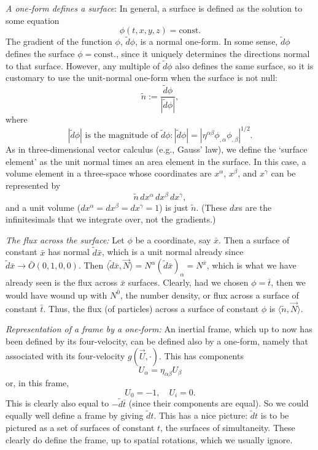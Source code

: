 \documentclass[12pt]{book}
\begin{document}
    \textit{A one-form defines a surface}: 
    In general, a surface is defined as the solution to some equation
    \[
    \phi(t, x, y, z) = \text{const.}
    \]
    The gradient of the function \(\phi\), \(\tilde{d}\phi\), is a normal one-form. In some sense, \(\tilde{d}\phi\) defines the surface \(\phi = \text{const.}\), since it uniquely determines the directions normal to that surface. However, any multiple of \(\tilde{d}\phi\) also defines the same surface, so it is customary to use the unit-normal one-form when the surface is not null:
    \[
    \tilde{n} := \frac{\tilde{d}\phi}{|\tilde{d}\phi|}, \tag{4.7}
    \]
    where
    \[
    |\tilde{d}\phi| \text{ is the magnitude of } \tilde{d}\phi : |\tilde{d}\phi| = \left|\eta^{\alpha\beta} \phi_{,\alpha} \phi_{,\beta}\right|^{1/2}. \tag{4.8}
    \]
    As in three-dimensional vector calculus (e.g., Gauss’ law), we define the ‘surface element’ as the unit normal times an area element in the surface. In this case, a volume element in a three-space whose coordinates are \(x^\alpha\), \(x^\beta\), and \(x^\gamma\) can be represented by
    \[
    \tilde{n} \, dx^\alpha \, dx^\beta \, dx^\gamma, \tag{4.9}
    \]
    and a unit volume (\(dx^\alpha = dx^\beta = dx^\gamma = 1\)) is just \(\tilde{n}\). (These \(dx\)s are the infinitesimals that we integrate over, not the gradients.)

    \textit{The flux across the surface:} 
    Let \(\phi\) be a coordinate, say \(\bar{x}\). Then a surface of constant \(\bar{x}\) has normal \(\tilde{d} \bar{x}\), which is a unit normal already since \(\tilde{d} \bar{x} \rightarrow \bar{O} (0, 1, 0, 0)\). Then \(\langle \tilde{d} \bar{x}, \vec{N} \rangle = N^\alpha (\tilde{d} \bar{x})_\alpha = N^{\bar{x}}\), which is what we have already seen is the flux across \(\bar{x}\) surfaces. Clearly, had we chosen \(\phi = \bar{t}\), then we would have wound up with \(N^{\bar{0}}\), the number density, or flux across a surface of constant \(\bar{t}\). Thus, the flux (of particles) across a surface of constant \(\phi\) is \(\langle \tilde{n}, \vec{N} \rangle\).

    \textit{Representation of a frame by a one-form:} 
    An inertial frame, which up to now has been defined by its four-velocity, can be defined also by a one-form, namely that associated with its four-velocity \(g(\vec{U}, \cdot)\). This has components
    \[
    U_\alpha = \eta_{\alpha\beta} U_\beta
    \]
    or, in this frame,
    \[
    U_0 = -1, \quad U_i = 0.
    \]
    This is clearly also equal to \(-\tilde{d}\bar{t}\) (since their components are equal). So we could equally well define a frame by giving \(\tilde{d} t\). This has a nice picture: \(\tilde{d} t\) is to be pictured as a set of surfaces of constant \(t\), the surfaces of simultaneity. These clearly do define the frame, up to spatial rotations, which we usually ignore.
\end{document}
